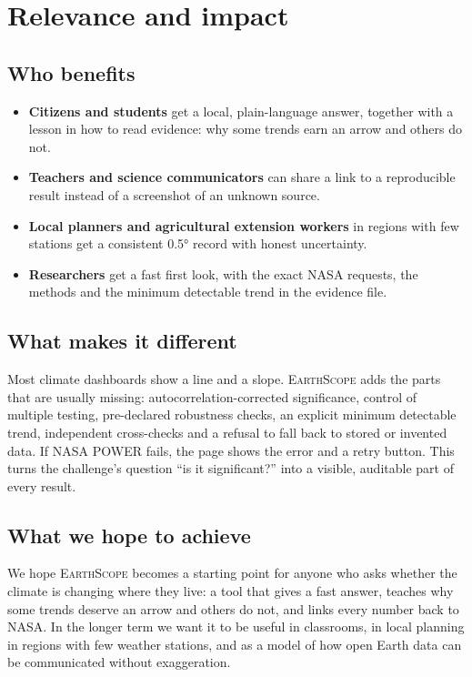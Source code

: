 \documentclass[12pt, oneside, openany]{report}
\newcommand{\EarthScope}{\textsc{EarthScope}}
\begin{document}
\chapter{Relevance and impact}\label{cap:relevance}

\section{Who benefits}

\begin{itemize}[leftmargin=*]
    \item \textbf{Citizens and students} get a local, plain-language answer, together with a lesson in how to read evidence: why some trends earn an arrow and others do not.
    \item \textbf{Teachers and science communicators} can share a link to a reproducible result instead of a screenshot of an unknown source.
    \item \textbf{Local planners and agricultural extension workers} in regions with few stations get a consistent 0.5° record with honest uncertainty.
    \item \textbf{Researchers} get a fast first look, with the exact NASA requests, the methods and the minimum detectable trend in the evidence file.
\end{itemize}

\section{What makes it different}

Most climate dashboards show a line and a slope. \EarthScope{} adds the parts that are usually missing: autocorrelation-corrected significance, control of multiple testing, pre-declared robustness checks, an explicit minimum detectable trend, independent cross-checks and a refusal to fall back to stored or invented data. If NASA POWER fails, the page shows the error and a retry button. This turns the challenge's question \enquote{is it significant?} into a visible, auditable part of every result.

\section{What we hope to achieve}

We hope \EarthScope{} becomes a starting point for anyone who asks whether the climate is changing where they live: a tool that gives a fast answer, teaches why some trends deserve an arrow and others do not, and links every number back to NASA. In the longer term we want it to be useful in classrooms, in local planning in regions with few weather stations, and as a model of how open Earth data can be communicated without exaggeration.
\end{document}
